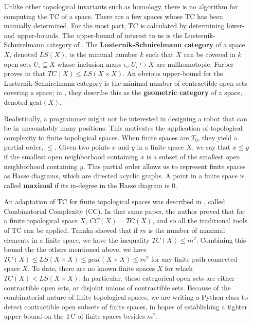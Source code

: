 \documentclass{article}
\begin{document}
Unlike other topological invariants such as homology, there is no algorithm for computing the TC of a space.
There are a few spaces whose TC has been manually determined.
For the most part, TC is calculated by determining lower- and upper-bounds.
The upper-bound of interest to us is the Lusternik-Schnirelmann category of \cite{LS34}.
The \textbf{Lusternik-Schnirelmann category} of a space $X$, denoted ${LS}(X)$, is the minimal number $k$ such that $X$ can be covered in $k$ open sets $U_i \subseteq X$ whose inclusion maps $\iota_i: U_i \hookrightarrow X$ are nullhomotopic.
Farber proves in \cite{Farber2001} that $TC(X) \leq LS(X\times X)$.
An obvious upper-bound for the Lusternik-Schnirelmann category is the minimal number of contractible open sets covering a space; in \cite{Fernandez-Ternero2018}, they describe this as the \textbf{geometric category} of a space, denoted $\text{gcat}(X)$.

Realistically, a programmer might not be interested in designing a robot that can be in uncountably many positions.
This motivates the application of topological complexity to finite topological spaces.
When finite spaces are $T_0$, they yield a partial order, $\leq$. Given two points $x$ and $y$ in a finite space $X$, we say that $x \leq y$ if the smallest open neighborhood containing $x$ is a subset of the smallest open neighborhood containing $y$. This partial order allows us to represent finite spaces as Hasse diagrams, which are directed acyclic graphs. A point in a finite space is called \textbf{maximal} if its in-degree in the Hasse diagram is 0.

An adaptation of TC for finite topological spaces was described in \cite{Tanaka2018}, called Combinatorial Complexity (CC).
In that same paper, the author proved that for a finite topological space $X$, $CC(X) = TC(X)$, and so all the traditional tools of TC can be applied.
Tanaka showed that if $m$ is the number of maximal elements in a finite space, we have the inequality $TC(X) \leq m^2$.
Combining this bound the the others mentioned above, we have $TC(X) \leq LS(X\times X) \leq gcat(X \times X) \leq m^2$ for any finite path-connected space $X$.
To date, there are no known finite spaces $X$ for which $TC(X) < LS(X \times X)$.
In particular, these categorical open sets are either contractible open sets, or disjoint unions of contractible sets.
Because of the combinatorial nature of finite topological spaces, we are writing a Python class to detect contractible open subsets of finite spaces, in hopes of establishing a tighter upper-bound on the TC of finite spaces besides $m^2$.

{}

\end{document}
